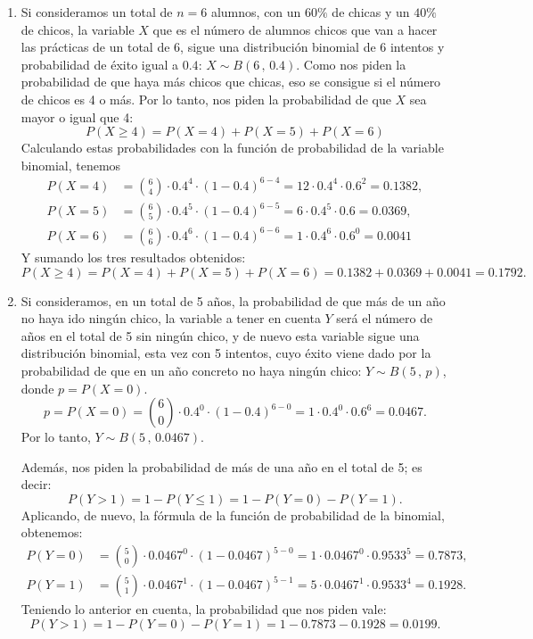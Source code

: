 {\begin{enumerate}
\item Si consideramos un total de $n=6$ alumnos, con un $60\%$ de chicas y un $40\%$ de chicos, la variable $X$ que es el número de alumnos chicos que van a hacer las prácticas de un total de 6, sigue una distribución binomial de 6 intentos y probabilidad de éxito igual a $0.4$: $X\sim B(6\,,\,0.4)$. Como nos piden la probabilidad de que haya más chicos que chicas, eso se consigue si el número de chicos es 4 o más. Por lo tanto, nos piden la probabilidad de que $X$ sea mayor o igual que 4:
\[
P(X \ge 4) = P(X = 4) + P(X = 5) + P(X = 6)
\]
Calculando estas probabilidades con la función de probabilidad de la variable binomial, tenemos
\begin{align*}
P(X = 4) &= \binom{6}{4}\cdot 0.4^4  \cdot (1-0.4)^{6-4}  = 12\cdot 0.4^4\cdot 0.6^2 = 0.1382,\\
P(X = 5) &= \binom{6}{5}\cdot 0.4^5  \cdot (1-0.4)^{6-5}  = 6\cdot 0.4^5 \cdot 0.6 = 0.0369,\\
P(X = 6) &= \binom{6}{6}\cdot 0.4^6  \cdot (1-0.4)^{6-6}  = 1\cdot 0.4^6 \cdot 0.6^0 = 0.0041
\end{align*}
Y sumando los tres resultados obtenidos:
\[
P(X \ge 4) = P(X = 4) + P(X = 5) + P(X = 6)= 0.1382+0.0369+0.0041=0.1792.
\]

\item Si consideramos, en un total de 5 años, la probabilidad de que más de un año no haya ido ningún chico, la variable a tener en cuenta $Y$ será el número de años en el total de 5 sin ningún chico, y de nuevo esta variable sigue una distribución binomial, esta vez con 5 intentos, cuyo éxito viene dado por la probabilidad de que en un año concreto no haya ningún chico: $Y \sim B(5\,,\,p)$, donde $p=P(X=0)$.
\[
p = P(X = 0) = \binom{6}{0}\cdot 0.4^0  \cdot (1-0.4)^{6-0}  = 1\cdot 0.4^0\cdot 0.6^6 = 0.0467.
\]
Por lo tanto, $Y \sim B(5\,,\,0.0467)$.

Además, nos piden la probabilidad de más de una año en el total de 5; es decir: 
\[
P(Y>1)=1-P(Y\leq 1) = 1-P(Y=0)-P(Y=1).
\]
Aplicando, de nuevo, la fórmula de la función de probabilidad de la binomial, obtenemos:
\begin{align*}
P(Y = 0) &= \binom{5}{0}\cdot 0.0467^0  \cdot (1 - 0.0467)^{5-0} = 1\cdot 0.0467^0\cdot 0.9533^5  = 0.7873,\\
P(Y = 1) &= \binom{5}{1}\cdot 0.0467^1  \cdot (1 - 0.0467)^{5-1} = 5\cdot 0.0467^1\cdot 0.9533^4  = 0.1928.
\end{align*}
Teniendo lo anterior en cuenta, la probabilidad que nos piden vale:
\[
P(Y>1)=1-P(Y=0)-P(Y=1)=1-0.7873-0.1928=0.0199.
\]
\end{enumerate}
}


